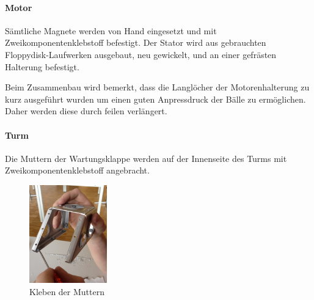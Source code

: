 \paragraph{Motor}
Sämtliche Magnete werden von Hand eingesetzt und mit Zweikomponentenklebstoff befestigt. Der Stator wird aus gebrauchten Floppydisk-Laufwerken ausgebaut, neu gewickelt, und an einer gefrästen Halterung befestigt.

Beim Zusammenbau wird bemerkt, dass die Langlöcher der Motorenhalterung zu kurz ausgeführt wurden um einen guten Anpressdruck der Bälle zu ermöglichen. Daher werden diese durch feilen verlängert.

\paragraph{Turm}
Die Muttern der Wartungsklappe werden auf der Innenseite des Turms mit Zweikomponentenklebstoff 
angebracht. 

\begin{figure}[h!]          
	\centering             
	\includegraphics[width=0.3\textwidth]{fig/IMG_2292.JPG}
	\caption{Kleben der Muttern}
	\label{fig:Muttern Kleben}        
\end{figure}


